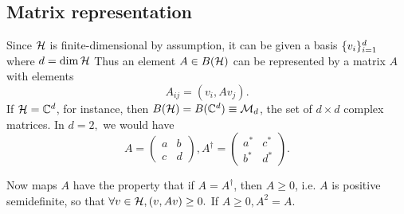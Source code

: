 \subsection*{Matrix representation} Since $\mathcal H$ is finite-dimensional by assumption, it can be given a basis $\{v_i\}^d_{i=1}$ where $d=\dim \mathcal H$ Thus an element $A\in B(\mathcal H)$ can be represented by a matrix $A$ with elements
\begin{equation}
    A_{ij}=(v_i,A v_j).
\end{equation}
If $\mathcal H=\mathbb{C}^d$, for instance, then $B(\mathcal H)=B(\mathbb{C}^d) \equiv \mathcal{M}_d$, the set of $d\times d$ complex matrices. In $d=2,$ we would have
\begin{equation}
    A=\begin{pmatrix}
        a & b\\
        c & d
    \end{pmatrix}, A^\dagger = \begin{pmatrix}
        a^* & c^* \\
        b^* & d^*
    \end{pmatrix}.
\end{equation}

Now maps $A$ have the property that if $A=A^\dagger$, then $A\geq 0$, i.e. $A$ is positive semidefinite, so that $\forall v\in \mathcal H, (v,Av)\geq 0.$ If $A\geq 0, A^2=A$.
